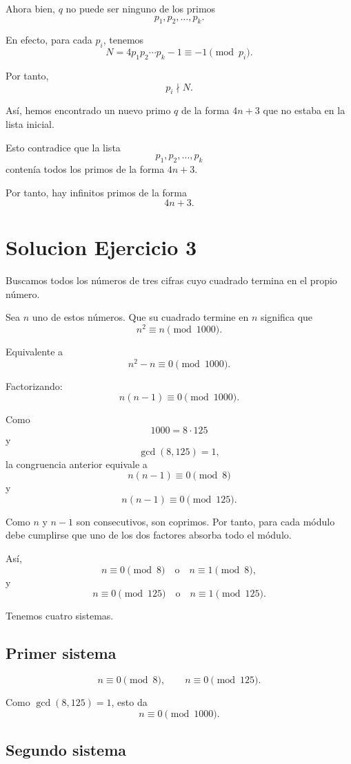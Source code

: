 \documentclass[12pt]{article}
\begin{document}
Ahora bien, \(q\) no puede ser ninguno de los primos
\[
p_1,p_2,\dots,p_k.
\]

En efecto, para cada \(p_i\), tenemos
\[
N=4p_1p_2\cdots p_k-1\equiv -1\pmod {p_i}.
\]

Por tanto,
\[
p_i\nmid N.
\]

Así, hemos encontrado un nuevo primo \(q\) de la forma \(4n+3\) que no estaba en la lista inicial.

Esto contradice que la lista
\[
p_1,p_2,\dots,p_k
\]
contenía todos los primos de la forma \(4n+3\).

Por tanto, hay infinitos primos de la forma
\[
4n+3.
\]

\section*{Solucion Ejercicio 3}

Buscamos todos los números de tres cifras cuyo cuadrado termina en el propio número.

Sea \(n\) uno de estos números. Que su cuadrado termine en \(n\) significa que
\[
n^2\equiv n\pmod{1000}.
\]

Equivalente a
\[
n^2-n\equiv 0\pmod{1000}.
\]

Factorizando:
\[
n(n-1)\equiv 0\pmod{1000}.
\]

Como
\[
1000=8\cdot 125
\]
y
\[
\gcd(8,125)=1,
\]
la congruencia anterior equivale a
\[
n(n-1)\equiv 0\pmod 8
\]
y
\[
n(n-1)\equiv 0\pmod {125}.
\]

Como \(n\) y \(n-1\) son consecutivos, son coprimos. Por tanto, para cada módulo debe cumplirse que uno de los dos factores absorba todo el módulo.

Así,
\[
n\equiv 0\pmod 8
\quad \text{o} \quad
n\equiv 1\pmod 8,
\]
y
\[
n\equiv 0\pmod {125}
\quad \text{o} \quad
n\equiv 1\pmod {125}.
\]

Tenemos cuatro sistemas.

\subsection*{Primer sistema}

\[
n\equiv 0\pmod 8,
\qquad
n\equiv 0\pmod {125}.
\]

Como \(\gcd(8,125)=1\), esto da
\[
n\equiv 0\pmod {1000}.
\]

\subsection*{Segundo sistema}
\end{document}
